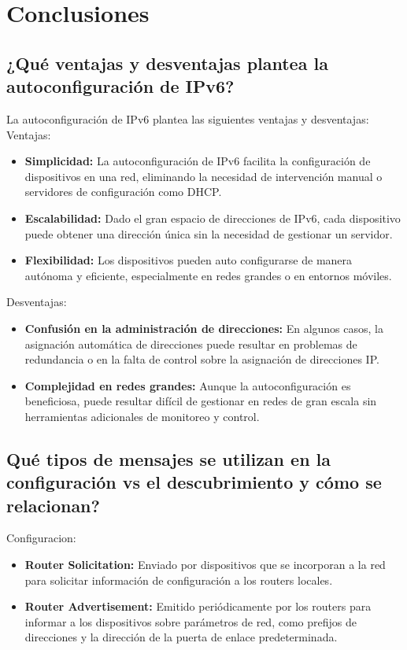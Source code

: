 \documentclass[a4paper,12pt]{article}
\begin{document}
\section{Conclusiones}
\subsection{¿Qué ventajas y desventajas plantea la autoconfiguración de IPv6?}

La autoconfiguración de IPv6 plantea las siguientes ventajas y desventajas:\\

Ventajas:\\
  \begin{itemize}
    \item{\textbf{Simplicidad:} La autoconfiguración de IPv6 facilita la configuración de dispositivos en una red, eliminando la necesidad de intervención manual o servidores de configuración como DHCP.}
    \item {\textbf{Escalabilidad:} Dado el gran espacio de direcciones de IPv6, cada dispositivo puede obtener una dirección única sin la necesidad de gestionar un servidor.}
    \item{\textbf{Flexibilidad:} Los dispositivos pueden auto configurarse de manera autónoma y eficiente, especialmente en redes grandes o en entornos móviles.} 
  \end{itemize}
\bigskip

Desventajas:\\
  \begin{itemize}
    \item {\textbf{Confusión en la administración de direcciones:} En algunos casos, la asignación automática de direcciones puede resultar en problemas de redundancia o en la falta de control sobre la asignación de direcciones IP.}
    \item {\textbf{Complejidad en redes grandes:} Aunque la autoconfiguración es beneficiosa, puede resultar difícil de gestionar en redes de gran escala sin herramientas adicionales de monitoreo y control.}
  \end{itemize}
\bigskip
\subsection{Qué tipos de mensajes se utilizan en la configuración vs el descubrimiento y cómo se relacionan?}


Configuracion:\\
  \begin{itemize}
    \item {\textbf{Router Solicitation:} Enviado por dispositivos que se incorporan a la red para solicitar información de configuración a los routers locales.}
    \item {\textbf{Router Advertisement:} Emitido periódicamente por los routers para informar a los dispositivos sobre parámetros de red, como prefijos de direcciones y la dirección de la puerta de enlace predeterminada.}
  \end{itemize}
\end{document}
